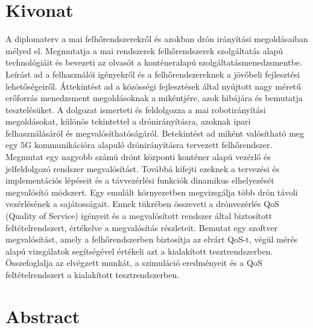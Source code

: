 
\selecthungarian

\chapter*{Kivonat}

A diplomaterv a mai felhőrendszerekről és azokban drón irányítási megoldásaiban mélyed el.
Megmutatja a mai rendszerek felhőrendszerek szolgáltatás alapú technológiáit és bevezeti az olvasót a konténeralapú szolgáltatásmenedzsmentbe. Leírást ad a felhasználói igényekről és a felhőrendszereknek a jövőbeli fejlesztési lehetőségeiről. Áttekintést ad a közösségi fejlesztések által nyújtott nagy méretű erőforrás menedzsment megoldásoknak a mikéntjére, azok hibájára és bemutatja tesztelésüket. A dolgozat ismerteti és feldolgozza a mai robotirányítási megoldásokat, különös tekintettel a drónirányításra, azoknak ipari felhasználásáról és megvalósíthatóságáról. Betekintést ad miként valósítható meg egy 5G kommunikációra alapuló drónirányításra tervezett felhőrendszer. Megmutat egy nagyobb számú drónt központi konténer alapú vezérlő és jelfeldolgozó rendszer megvalósítást. Továbbá kifejti ezeknek a tervezési és implementációs lépéseit és a távvezérlési funkciók dinamikus elhelyezését megvalósító módszert. Egy emulált környezetben megvizsgálja több drón távoli vezérlésének a sajátosságait. Ennek tükrében összeveti a drónvezérlés QoS (Quality of Service) igényeit és a megvalósított rendszer által biztosított feltételrendszert, értékelve a megvalósítás részleteit. Bemutat egy  szoftver megvalósítást, amely a felhőrendszerben biztosítja az elvárt QoS-t, végül mérés alapú vizsgálatok segítségével értékeli azt a kialakított tesztrendszerben. Összefoglalja az elvégzett munkát, a szimuláció eredményeit és a QoS feltételrendszert a kialakított tesztrendszerben.


\vfill
\selectenglish


\chapter*{Abstract}

